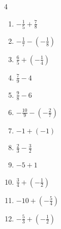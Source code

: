 \begin{multicols}{4}
\begin{enumerate}

  \item $\displaystyle -\frac{1}{5} + \frac{7}{8}$


  \item $\displaystyle -\frac{1}{7} - \left(-\frac{1}{8}\right)$


  \item $\displaystyle \frac{6}{5} + \left(-\frac{1}{4}\right)$


\columnbreak %

  \item $\displaystyle \frac{7}{9} - 4$


  \item $\displaystyle \frac{9}{8} - 6$


  \item $\displaystyle -\frac{10}{9} - \left(-\frac{2}{7}\right)$


  \item $\displaystyle -1 + \left(-1\right)$

        \phantom{$\displaystyle =-2$}

  \item $\displaystyle \frac{2}{3} - \frac{3}{2}$


  \item $\displaystyle -5 + 1$

        \phantom{$\displaystyle =-4$}

  \item $\displaystyle \frac{3}{4} + \left(-\frac{1}{2}\right)$


  \item $\displaystyle -10 + \left(-\frac{5}{4}\right)$


  \item $\displaystyle -\frac{5}{3} + \left(-\frac{1}{2}\right)$


\end{enumerate}
\end{multicols}
